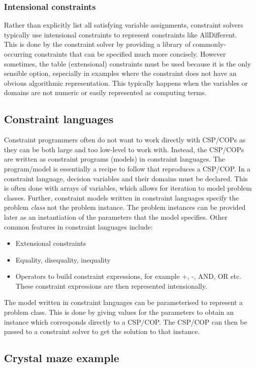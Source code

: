 \documentclass[CS4402-Notes.tex]{subfiles}
\begin{document}
\subsubsection{Intensional constraints}
Rather than explicitly list all satisfying variable assignments, constraint solvers typically use intensional constraints to represent constraints like AllDifferent. This is done by the constraint solver by providing a library of commonly-occurring constraints that can be specified much more concisely. 
\n
However sometimes, the table (extensional) constraints must be used because it is the only sensible option, especially in examples where the constraint does not have an obvious algorithmic representation. This typically happens when the variables or domains are not numeric or easily represented as computing terms. 

\subsection{Constraint languages}
Constraint programmers often do not want to work directly with CSP/COPs as they can be both large and too low-level to work with. Instead, the CSP/COPs are written as constraint programs (models) in constraint languages. The program/model is essentially a recipe to follow that reproduces a CSP/COP. 
\n
In a constraint language, decision variables and their domains must be declared. This is often done with arrays of variables, which allows for iteration to model problem classes. Further, constraint models written in constraint languages specify the problem \textit{class} not the problem instance. The problem instances can be provided later as an instantiation of the parameters that the model specifies. Other common features in constraint languages include:
\begin{itemize}
\item Extensional constraints
\item Equality, disequality, inequality
\item Operators to build constraint expressions, for example +, -, AND, OR etc. These constraint expressions are then represented intensionally. 
\end{itemize}
The model written in constraint languages can be parameterised to represent a problem class. This is done by giving values for the parameters to obtain an instance which corresponds directly to a CSP/COP. The CSP/COP can then be passed to a constraint solver to get the solution to that instance.

\subsection{Crystal maze example}
\end{document}
